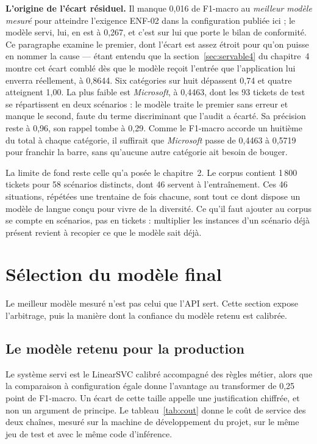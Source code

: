 \label{sec:pourquoi}

\textbf{L'origine de l'écart résiduel.} Il manque 0,016 de F1-macro au \emph{meilleur modèle mesuré} pour atteindre l'exigence ENF-02
dans la configuration publiée ici ; le modèle servi, lui, en est à 0,267, et c'est sur lui que
porte le bilan de conformité. Ce paragraphe examine le premier, dont l'écart est assez étroit pour
qu'on puisse en nommer la cause — étant entendu que la section~\ref{sec:servable4} du chapitre~4
montre cet écart comblé dès que le modèle reçoit l'entrée que l'application lui enverra
réellement, à 0,8644.
Six catégories sur huit
dépassent 0,74 et quatre atteignent 1,00. La plus faible est \emph{Microsoft}, à 0,4463, dont les
93 tickets de test se répartissent en deux scénarios : le modèle traite le premier sans erreur et
manque le second, faute du terme discriminant que l'audit a écarté. Sa précision reste à 0,96, son
rappel tombe à 0,29. Comme le F1-macro accorde un huitième du total à chaque catégorie, il suffirait
que \emph{Microsoft} passe de 0,4463 à 0,5719 pour franchir la barre, sans qu'aucune autre catégorie
ait besoin de bouger.

La limite de fond reste celle qu'a posée le chapitre~2. Le corpus contient 1\,800 tickets pour
58 scénarios distincts, dont 46 servent à l'entraînement. Ces 46 situations, répétées une trentaine
de fois chacune, sont tout ce dont dispose un modèle de langue conçu pour vivre de la diversité. Ce
qu'il faut ajouter au corpus se compte en scénarios, pas en tickets : multiplier les instances d'un
scénario déjà présent revient à recopier ce que le modèle sait déjà.

\section{Sélection du modèle final}

Le meilleur modèle mesuré n'est pas celui que l'API sert. Cette section expose
l'arbitrage, puis la manière dont la confiance du modèle retenu est calibrée.

\subsection{Le modèle retenu pour la production}

\label{sec:production}

Le système servi est le LinearSVC calibré accompagné des règles métier, alors que la comparaison à
configuration égale donne l'avantage au transformer de 0,25 point de F1-macro. Un écart de cette
taille appelle une justification chiffrée, et non un argument de principe. Le tableau~\ref{tab:cout}
donne le coût de service des deux chaînes, mesuré sur la machine de développement du projet, sur le
même jeu de test et avec le même code d'inférence.

